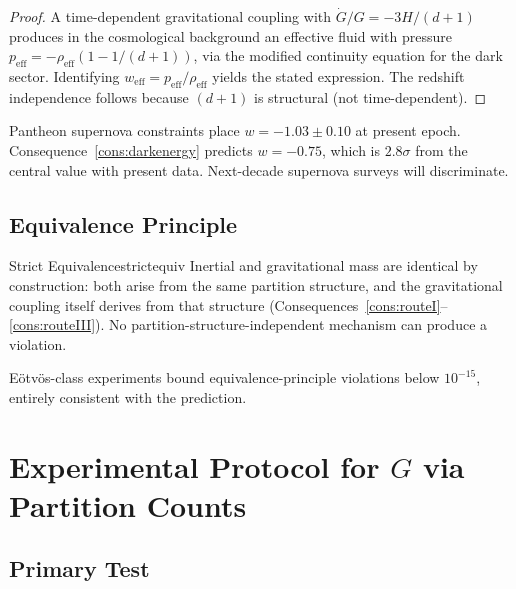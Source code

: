 \begin{proof}
A time-dependent gravitational coupling with $\dot{G}/G = -3H/(d+1)$ produces
in the cosmological background an effective fluid with pressure
$p_{\mathrm{eff}} = -\rho_{\mathrm{eff}}(1 - 1/(d+1))$, via the modified
continuity equation for the dark sector.
Identifying $w_{\mathrm{eff}} = p_{\mathrm{eff}}/\rho_{\mathrm{eff}}$ yields
the stated expression.
The redshift independence follows because $(d+1)$ is structural
(not time-dependent).
\end{proof}

\begin{remark}
Pantheon supernova constraints place $w = -1.03\pm0.10$ at present epoch.
Consequence~\ref{cons:darkenergy} predicts $w = -0.75$, which is $2.8\sigma$
from the central value with present data.
Next-decade supernova surveys will discriminate.
\end{remark}

\subsection{Equivalence Principle}
\label{sec:ch20-equiv}

\begin{consequence}{Strict Equivalence}{strictequiv}
  Inertial and gravitational mass are identical by construction: both arise from
  the same partition structure, and the gravitational coupling itself derives from
  that structure (Consequences~\ref{cons:routeI}--\ref{cons:routeIII}).
  No partition-structure-independent mechanism can produce a violation.
\end{consequence}

\noindent
E\"otv\"os-class experiments bound equivalence-principle violations below
$10^{-15}$, entirely consistent with the prediction.

\section{Experimental Protocol for $G$ via Partition Counts}
\label{sec:ch20-Gexperimental}

\subsection{Primary Test}

